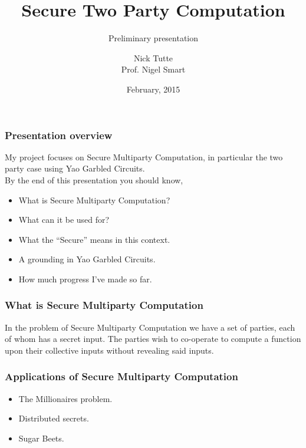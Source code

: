 \documentclass{beamer}
\begin{document}
	\title[Crisis]{Secure Two Party Computation}
	\subtitle{Preliminary presentation}
	\author[Author]{Nick Tutte\\[1ex]{\tiny Prof. Nigel Smart}}
	\date[Feb 2015]
	{February, 2015}
	\subject{Computer Science}
	\frame{\titlepage}


	\begin{frame}
		\frametitle{Presentation overview}
		My project focuses on Secure Multiparty Computation, in particular the two party case using Yao Garbled Circuits.\\

		By the end of this presentation you should know,
		\begin{itemize}
			\item What is Secure Multiparty Computation?
			\item What can it be used for?
			\item What the ``Secure'' means in this context.
			\item A grounding in Yao Garbled Circuits.
			\item How much progress I've made so far.
		\end{itemize}

	\end{frame}
  
	\begin{frame}
		\frametitle{What is Secure Multiparty Computation}
		In the problem of Secure Multiparty Computation we have a set of parties, each of whom has a secret input. The parties wish to co-operate to compute a function upon their collective inputs without revealing said inputs.\\
		
	\end{frame}
    
	\begin{frame}
		\frametitle{Applications of Secure Multiparty Computation}
		\begin{itemize}
			\item The Millionaires problem.
			\item Distributed secrets.
			\item Sugar Beets.
		\end{itemize}
		
	\end{frame}
\end{document}
